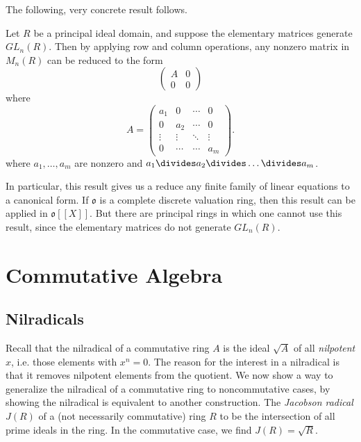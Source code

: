 The following, very concrete result follows.

\begin{theorem}
    Let $R$ be a principal ideal domain, and suppose the elementary matrices generate $GL_n(R)$. Then by applying row and column operations, any nonzero matrix in $M_n(R)$ can be reduced to the form
    \[ \begin{pmatrix}
            A & 0 \\ 0 & 0
    \end{pmatrix} \]
    where
    \[ A = \begin{pmatrix} a_1 & 0 & \cdots & 0 \\ 0 & a_2 & \cdots & 0 \\ \vdots & \vdots & \ddots & \vdots \\ 0 & \cdots & \cdots & a_m \end{pmatrix}. \]
    where $a_1,\dots,a_m$ are nonzero and $a_1 \divides a_2 \divides \dots \divides a_m$.
\end{theorem}

In particular, this result gives us a reduce any finite family of linear equations to a canonical form. If $\mathfrak{o}$ is a complete discrete valuation ring, then this result can be applied in $\mathfrak{o}[[X]]$. But there are principal rings in which one cannot use this result, since the elementary matrices do not generate $GL_n(R)$.




\part{Commutative Algebra}

\chapter{Nilradicals}

Recall that the nilradical of a commutative ring $A$ is the ideal $\sqrt{A}$ of all {\it nilpotent} $x$, i.e. those elements with $x^n = 0$. The reason for the interest in a nilradical is that it removes nilpotent elements from the quotient. We now show a way to generalize the nilradical of a commutative ring to noncommutative cases, by showing the nilradical is equivalent to another construction. The \emph{Jacobson radical} $J(R)$ of a (not necessarily commutative) ring $R$ to be the intersection of all prime ideals in the ring. In the commutative case, we find $J(R) = \sqrt{R}$.

